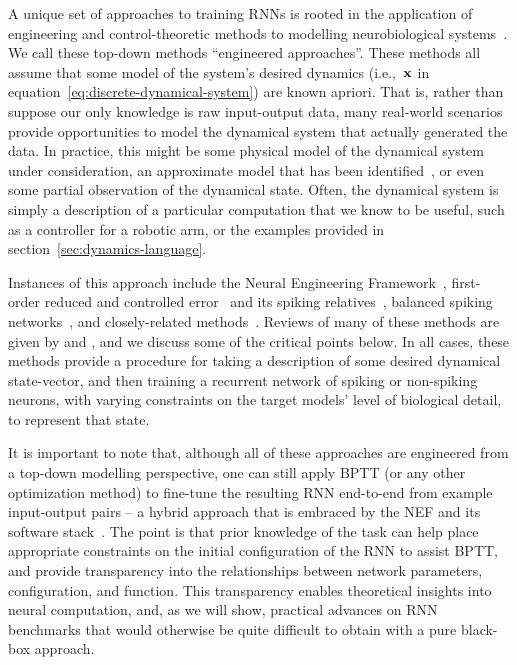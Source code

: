 A unique set of approaches to training RNNs is rooted in the application of engineering and control-theoretic methods to modelling neurobiological systems~\citep{eliasmith1999developing}.
We call these top-down methods ``engineered approaches''.
These methods all assume that some model of the system's desired dynamics (i.e.,~$\mathbf{x}$ in equation~\ref{eq:discrete-dynamical-system}) are known apriori.
That is, rather than suppose our only knowledge is raw input-output data, many real-world scenarios provide opportunities to model the dynamical system that actually generated the data.
In practice, this might be some physical model of the dynamical system under consideration, an approximate model that has been identified~\citep{nelles2013nonlinear}, or even some partial observation of the dynamical state.
Often, the dynamical system is simply a description of a particular computation that we know to be useful, such as a controller for a robotic arm, or the examples provided in section~\ref{sec:dynamics-language}.

Instances of this approach include the Neural Engineering Framework~\citep[NEF;][]{eliasmith2003a, duggins2017incorporating}, first-order reduced and controlled error~\citep[FORCE;][]{sussillo2009generating, depasquale2018full} and its spiking relatives~\citep{nicola2016supervised, thalmeier2016learning}, balanced spiking networks~\citep{boerlin2011spike, boerlin2013predictive, schwemmer2015constructing, alemi2018learning}, and closely-related methods~\citep{jaeger2014controlling, gilra2017predicting}.
Reviews of many of these methods are given by \citet{deneve2016efficient} and \citet{abbott2016building}, and we discuss some of the critical points below.
In all cases, these methods provide a procedure for taking a description of some desired dynamical state-vector, and then training a recurrent network of spiking or non-spiking neurons, with varying constraints on the target models' level of biological detail, to represent that state.

It is important to note that, although all of these approaches are engineered from a top-down modelling perspective, one can still apply BPTT (or any other optimization method) to fine-tune the resulting RNN end-to-end from example input-output pairs -- a hybrid approach that is embraced by the NEF and its software stack~\citep{rasmussen2018nengodl}.
The point is that prior knowledge of the task can help place appropriate constraints on the initial configuration of the RNN to assist BPTT, and provide transparency into the relationships between network parameters, configuration, and function.
This transparency enables theoretical insights into neural computation, and, as we will show, practical advances on RNN benchmarks that would otherwise be quite difficult to obtain with a pure black-box approach.

